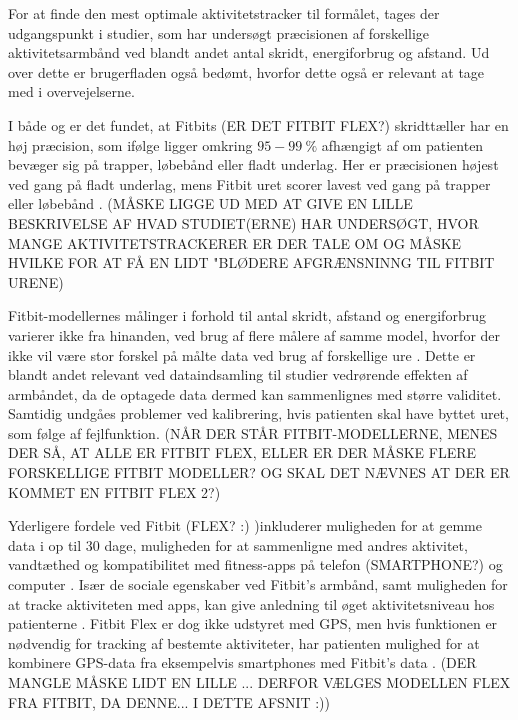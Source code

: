 For at finde den mest optimale aktivitetstracker til formålet, tages der udgangspunkt i studier, som har undersøgt præcisionen af forskellige aktivitetsarmbånd ved blandt andet antal skridt, energiforbrug og afstand. Ud over dette er brugerfladen også bedømt, hvorfor dette også er relevant at tage med i overvejelserne.

I både \citep{evenson2015} og \citep{kaewkannate2016} er det fundet, at Fitbits (ER DET FITBIT FLEX?) skridttæller har en høj præcision, som ifølge \citep{kaewkannate2016} ligger omkring  $95-99~\%$ afhængigt af om patienten bevæger sig på trapper, løbebånd eller fladt underlag. Her er præcisionen højest ved gang på fladt underlag, mens Fitbit uret scorer lavest ved gang på trapper eller løbebånd \citep{kaewkannate2016}.  (MÅSKE LIGGE UD MED AT GIVE EN LILLE BESKRIVELSE AF HVAD STUDIET(ERNE) HAR UNDERSØGT, HVOR MANGE AKTIVITETSTRACKERER ER DER TALE OM OG MÅSKE HVILKE FOR AT FÅ EN LIDT "BLØDERE AFGRÆNSNINNG TIL FITBIT URENE)

Fitbit-modellernes målinger i forhold til antal skridt, afstand og energiforbrug varierer ikke fra hinanden, ved brug af flere målere af samme model, hvorfor der ikke vil være stor forskel på målte data ved brug af forskellige ure \citep{evenson2015}. Dette er blandt andet relevant ved dataindsamling til studier vedrørende effekten af armbåndet, da de optagede data dermed kan sammenlignes med større validitet. Samtidig undgåes problemer ved kalibrering, hvis patienten skal have byttet uret, som følge af fejlfunktion. (NÅR DER STÅR FITBIT-MODELLERNE, MENES DER SÅ, AT ALLE ER FITBIT FLEX, ELLER ER DER MÅSKE FLERE FORSKELLIGE FITBIT MODELLER? OG SKAL DET NÆVNES AT DER ER KOMMET EN FITBIT FLEX 2?)

Yderligere fordele ved Fitbit (FLEX? :) )inkluderer muligheden for at gemme data i op til $30$ dage, muligheden for at sammenligne med andres aktivitet, vandtæthed og kompatibilitet med fitness-apps på telefon (SMARTPHONE?) og computer \citep{kaewkannate2016, fitbitflex}. Især de sociale egenskaber ved Fitbit's armbånd, samt muligheden for at tracke aktiviteten med apps, kan give anledning til øget aktivitetsniveau hos patienterne \citep{karapanos2016, rooksby2014}. Fitbit Flex er dog ikke udstyret med GPS, men hvis funktionen er nødvendig for tracking af bestemte aktiviteter, har patienten mulighed for at kombinere GPS-data fra eksempelvis smartphones med Fitbit's data \citep{fitbitflex}. (DER MANGLE MÅSKE LIDT EN LILLE ... DERFOR VÆLGES MODELLEN FLEX FRA FITBIT, DA DENNE... I DETTE AFSNIT :))